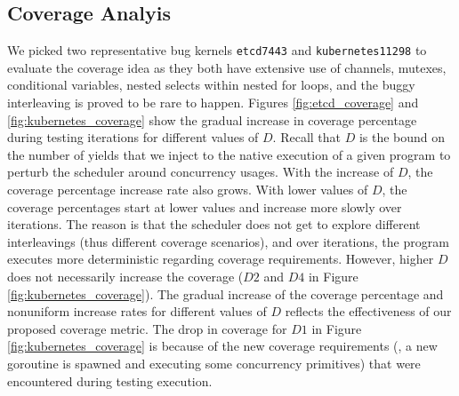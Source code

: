\subsection{Coverage Analyis}
We picked two representative bug kernels \texttt{etcd7443} and \texttt{kubernetes11298} to evaluate the coverage idea as they both have extensive use of channels, mutexes, conditional variables, nested selects within nested for loops, and the buggy interleaving is proved to be rare to happen.
%
Figures \ref{fig:etcd_coverage} and \ref{fig:kubernetes_coverage} show the gradual increase in coverage percentage during testing iterations for different values of $D$.
%
Recall that $D$ is the bound on the number of yields that we inject to the native execution of a given program to perturb the scheduler around concurrency usages.
%
With the increase of $D$, the coverage percentage increase rate also grows.
%
With lower values of $D$, the coverage percentages start at lower values and increase more slowly over iterations.
%
The reason is that the scheduler does not get to explore different interleavings (thus different coverage scenarios), and over iterations, the program executes more deterministic regarding coverage requirements.
%
However, higher $D$ does not necessarily increase the coverage ($D2$ and $D4$ in Figure \ref{fig:kubernetes_coverage}).
%
The gradual increase of the coverage percentage and nonuniform increase rates for different values of $D$ reflects the effectiveness of our proposed coverage metric.
%
The drop in coverage for $D1$ in Figure \ref{fig:kubernetes_coverage} is because of the new coverage requirements (\eg, a new goroutine is spawned and executing some concurrency primitives) that were encountered during testing execution.
%
